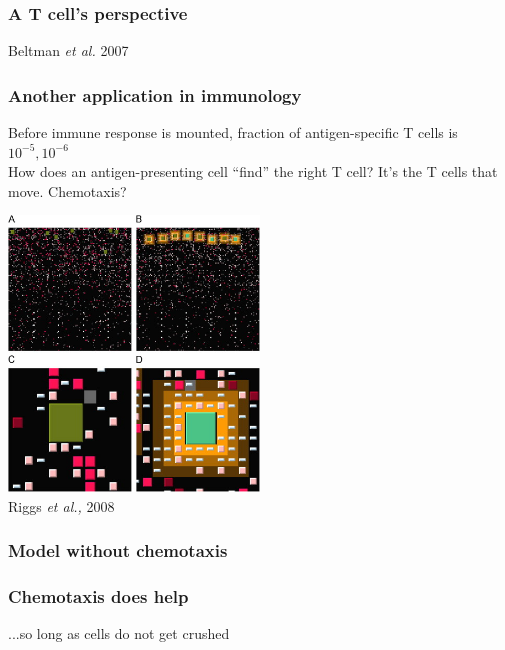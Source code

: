 \documentclass[compress]{beamer}
\begin{document}
\begin{frame}
\frametitle{A T cell's perspective}   
\begin{center}
\tiny Beltman \textit{et al.} 2007
\end{center}
\end{frame}

\begin{frame}
\frametitle{Another application in immunology} %
Before immune response is mounted, fraction of antigen-specific T cells is ~$10^{-5},10^{-6}$\\ 
How does an antigen-presenting cell ``find'' the right T cell? It's the T cells that move.
Chemotaxis? %
\begin{center}
 \includegraphics[width=0.5\textwidth]{figures/riggs.jpg}\\
 \tiny Riggs \textit{et al.,} 2008
\end{center}
\end{frame}

\begin{frame}
\frametitle{Model without chemotaxis} %
\begin{center}
\end{center}
\end{frame}

\begin{frame}
\frametitle{Chemotaxis does help} %
\begin{center}
\end{center}
...so long as cells do not get crushed
\end{frame}
\end{document}
